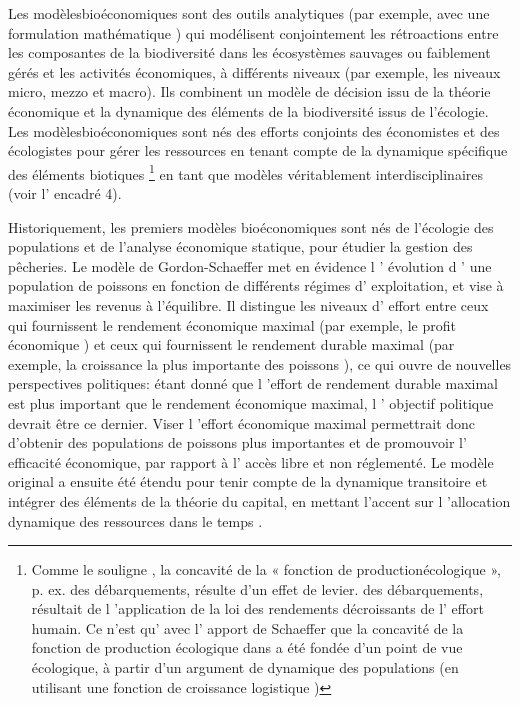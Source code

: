 \begin{displayquote}
\begin{displayquote}
\begin{displayquote}
{{{ 
Les modèlesbioéconomiques sont des outils analytiques (par exemple, avec une formulation mathématique ) qui modélisent conjointement les rétroactions entre les composantes de la biodiversité dans les écosystèmes sauvages ou faiblement gérés et les activités économiques, à différents niveaux (par exemple, les niveaux micro, mezzo et macro). Ils combinent un modèle de décision issu de la théorie économique et la dynamique des éléments de la biodiversité issus de l'écologie. Les modèlesbioéconomiques \citep{Gordon1954, smith_models_1969, clark_profit_1973} sont nés des efforts conjoints des économistes et des écologistes pour gérer les ressources en tenant compte de la dynamique spécifique des éléments biotiques \citep{Parent_Mouysset_Missemer_Levrel_2024}\footnote{Comme le souligne \citep{Parent_Mouysset_Missemer_Levrel_2024}, la concavité de la « fonction de productionécologique », p. ex. des débarquements, résulte d'un effet de levier.     des débarquements, résultait de l 'application de la loi des rendements décroissants de l' effort humain.     Ce n'est qu' avec l' apport de Schaeffer que la concavité de la fonction de production écologique dans \cite{Gordon1954} a été fondée d'un point de vue écologique, à partir d'un argument de dynamique des populations (en utilisant une fonction de croissance logistique )} en tant que modèles véritablement interdisciplinaires (voir l' encadré 4). 



Historiquement, les premiers modèles bioéconomiques sont nés de l'écologie des populations et de l'analyse économique statique, pour étudier la gestion des pêcheries. Le modèle de Gordon-Schaeffer \citep{Gordon1954, Schaefer1954} met en évidence l ' évolution d ' une population de poissons en fonction de différents régimes d' exploitation, et vise à maximiser les revenus à l'équilibre. Il distingue les niveaux d' effort entre ceux qui fournissent le rendement économique maximal (par exemple, le profit économique ) et ceux qui fournissent le rendement durable maximal (par exemple, la croissance la plus importante des poissons ), ce qui ouvre de nouvelles perspectives politiques: étant donné que l 'effort de rendement durable maximal est plus important que le rendement économique maximal, l ' objectif politique devrait être ce dernier. Viser l 'effort économique maximal permettrait donc d'obtenir des populations de poissons plus importantes et de promouvoir l' efficacité économique, par rapport à l' accès libre et non réglementé. Le modèle original a ensuite été étendu pour tenir compte de la dynamique transitoire et intégrer des éléments de la théorie du capital, en mettant l'accent sur l 'allocation dynamique des ressources dans le temps \citep{smith_models_1969, clark_profit_1973}. 



}}}
\end{displayquote}
\end{displayquote}
\end{displayquote}

